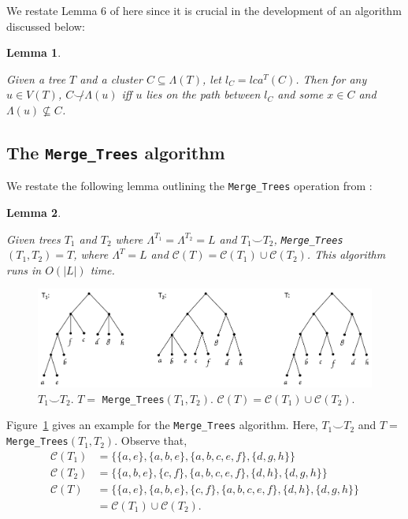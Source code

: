 \documentclass{article}
\newcommand{\compatible}{\smile}
\newcommand{\leafset}{\Lambda}
\newtheorem{incompatibility}{Lemma}
\newtheorem{mergetrees}[incompatibility]{Lemma}
\begin{document}
    We restate Lemma 6 of \cite{jansson2018algorithms} here since it is crucial in the development of an algorithm discussed below:
    \newline

    \begin{incompatibility}
        \label{lem:incompatibility}

        Given a tree $T$ and a cluster $C \subseteq \leafset(T)$, let $l_C = lca^T(C)$. Then for any $u \in V(T)$, $C \not\compatible \leafset(u)$ iff $u$ lies on the path between $l_C$ and some $x \in C$ and $\leafset(u) \not\subseteq C$.
    \end{incompatibility}

    \subsection{The \texttt{Merge\_Trees} algorithm}
    \label{subsec:mergetrees}

    We restate the following lemma outlining the \texttt{Merge\_Trees} operation from \cite{jansson2016improved}:
    \newline

    \begin{mergetrees}
        \label{lem:mergetrees}

        Given trees $T_1$ and $T_2$ where $\leafset^{T_1} = \leafset^{T_2} = L$ and $T_1 \compatible T_2$, \texttt{Merge\_Trees}$(T_1, T_2) = T$, where $\leafset^T = L$ and $\mathcal{C}(T) = \mathcal{C}(T_1) \cup \mathcal{C}(T_2)$. This algorithm runs in $O(|L|)$ time.
    \end{mergetrees}

    \begin{figure}[h]
        \includegraphics[scale=0.5]{mergetrees}
        \centering
        \caption{$T_1 \compatible T_2$. $T =$ \texttt{Merge\_Trees}$(T_1, T_2)$. $\mathcal{C}(T) = \mathcal{C}(T_1) \cup \mathcal{C}(T_2)$.}
        \label{fig:mergetrees}
    \end{figure}

    Figure~\ref{fig:mergetrees} gives an example for the \texttt{Merge\_Trees} algorithm. Here, $T_1 \compatible T_2$ and $T =$ \texttt{Merge\_Trees}$(T_1, T_2)$. Observe that,
    \begin{align*}
        \mathcal{C}(T_1) &= \{\{a, e\}, \{a, b, e\}, \{a, b, c, e, f\}, \{d, g, h\}\}\\
        \mathcal{C}(T_2) &= \{\{a, b, e\}, \{c, f\}, \{a, b, c, e, f\}, \{d, h\}, \{d, g, h\}\}\\
        \mathcal{C}(T) &= \{\{a, e\}, \{a, b, e\}, \{c, f\}, \{a, b, c, e, f\}, \{d, h\}, \{d, g, h\}\}\\
        &= \mathcal{C}(T_1) \cup \mathcal{C}(T_2).
    \end{align*}
\end{document}

